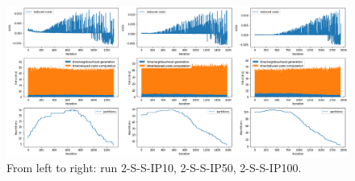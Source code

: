 \begin{landscape}
    \begin{figure}
        \includegraphics[width=25cm]{pics/experiments_4.png}
        \caption{From left to right: run 2-S-S-IP10, 2-S-S-IP50, 2-S-S-IP100.}
        \label{fig:setting4}
    \end{figure}
\end{landscape}


